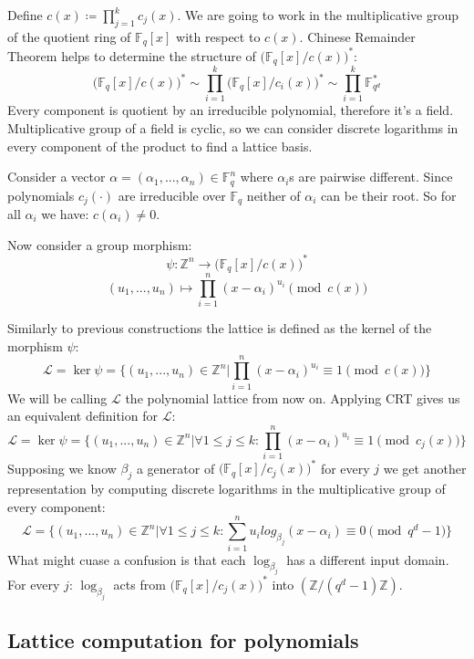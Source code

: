 \documentclass[12pt]{article}
\newcommand{\FF}{\mathbb{F}}
\newcommand{\ZZ}{\mathbb{Z}}
\newcommand{\LL}{\mathcal{L}}
\begin{document}
Define $c(x) \coloneqq \prod_{j = 1}^{k} c_{j}(x)$. We are going to work in the multiplicative group of the quotient ring of  $\FF_{q}[x]$ with respect to $c(x)$.
Chinese Remainder Theorem helps to determine the structure of $\big(\FF_{q}[x]/c(x)\big)^{*}$:
\[
    \big(\FF_{q}[x]/c(x)\big)^{*} \sim \prod_{i=1}^{k}\big(\FF_{q}[x]/c_{i}(x)\big)^{*} \sim \prod_{i=1}^{k}\FF_{q^{d}}^*
\]
Every component is quotient by an irreducible polynomial, therefore it's a field. Multiplicative group of a field is cyclic, so we can consider discrete logarithms in every component of the product to find a lattice basis.

Consider a vector $\alpha = (\alpha_{1}, ... , \alpha_{n}) \in \FF_{q}^{n}$ where $\alpha_{i}$s are pairwise different. Since polynomials $c_{j}(\cdot)$ are irreducible over $\FF_{q}$ neither of $\alpha_{i}$ can be their root. So for all $\alpha_{i}$ we have: $c(\alpha_{i}) \neq 0$.

Now consider a group morphism:
\[
    \psi : \ZZ^{n} \rightarrow \big(\FF_{q}[x]/c(x)\big)^{*}
\]
\[
    (u_{1}, ..., u_{n}) \mapsto \prod_{i=1}^{n}(x - \alpha_{i})^{u_{i}} \pmod{c(x)}
\]

Similarly to previous constructions the lattice is defined as the kernel of the morphism $\psi$:
\[
    \LL = \ker \psi = \{(u_{1}, ..., u_{n}) \in \ZZ^{n} | \prod_{i=1}^{n}(x - \alpha_{i})^{u_{i}} \equiv 1 \pmod{c(x)}\}
\]
We will be calling $\LL$ the polynomial lattice from now on. Applying CRT gives us an equivalent definition for $\LL$:
\[
    \LL = \ker \psi = \{(u_{1}, ..., u_{n}) \in \ZZ^{n} |  \forall 1 \leq j \leq k: \prod_{i=1}^{n}(x - \alpha_{i})^{u_{i}} \equiv 1 \pmod{c_{j}(x)}\}
\]
Supposing we know $\beta_{j}$ a generator of $\big(\FF_{q}[x]/c_{j}(x)\big)^{*}$ for every $j$ we get another representation by computing discrete logarithms in the multiplicative group of every component:
\[
    \LL = \{(u_{1}, ..., u_{n}) \in \ZZ^{n} | \forall 1 \leq j \leq k: \sum_{i=1}^{n}u_{i}log_{\beta_{j}}(x - \alpha_{i}) \equiv 0 \pmod{q^{d} -1}\}
\]
What might cuase a confusion is that each $\log_{\beta_{j}}$ has a different input domain. For every $j$:  $\log_{\beta_{j}}$ acts from $\big(\FF_{q}[x]/c_{j}(x)\big)^{*}$ into $(\ZZ/(q^{d} - 1)\ZZ)$.


\subsection{Lattice computation for polynomials}
\label{subsec:compute_basis_polynomials}
\end{document}
